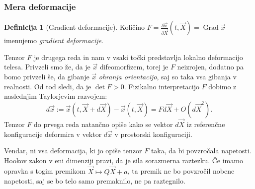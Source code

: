 \documentclass[12pt,a4paper,twoside]{article}
\theoremstyle{definition} %
\newtheorem{definicija}{Definicija}[section]
\theoremstyle{plain} %
\numberwithin{equation}{section}
\newcommand{\Grad}{\operatorname{Grad}}
\newcommand{\dpar}[2]{\ensuremath{\frac{\partial #1}{\partial #2}}}
\newcommand{\vX}{\vec{X}}
\newcommand{\vx}{\vec{x}}
\begin{document}
\subsubsection{Mera deformacije}
\begin{definicija}[Gradient deformacije]
  Količino $F = \dpar{\vx}{\vX}(t, \vX) = \Grad \vx$ imenujemo \emph{gradient
  deformacije}.
\end{definicija}

Tenzor $F$ je drugega reda in nam v vsaki točki predstavlja lokalno deformacijo
telesa. Privzeli smo že, da je $\vx$ difeomorfizem, torej je $F$ neizrojen,
dodatno pa bomo privzeli še, da gibanje $\vx$ \emph{ohranja orientacijo}, saj
so taka vsa gibanja v realnosti. Od tod sledi, da je $\det F > 0$.
Fizikalno interpretacijo $F$ dobimo z naslednjim Taylorjevim razvojem:
\begin{equation}
   d\vx := \vx(t, \vX+d\vX) - \vx(t, \vX) = F d\vX + O(d\vX^2).
\end{equation}
Tenzor $F$ do prvega reda natančno opiše kako se vektor $d\vX$ iz referenčne
konfiguracije deformira v vektor $d\vx$ v prostorski konfiguraciji.

Vendar, ni vsa deformacija, ki jo opiše tenzor $F$ taka, da bi povzročala
napetosti. Hookov zakon v eni dimenziji pravi, da je sila sorazmerna raztezku.
Če imamo opravka s togim premikom $\vX \mapsto Q\vX + a$, ta premik ne bo povzročil
nobene napetosti, saj se bo telo samo premaknilo, ne pa raztegnilo.
\end{document}
